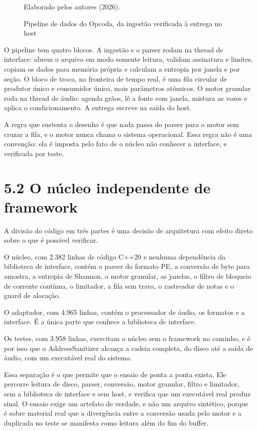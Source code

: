 \documentclass[12pt,a4paper]{article}
\begin{document}
\begin{figure}
\centering
\resizebox{\textwidth}{!}{}
\caption{Pipeline de dados do Opcoda, da ingestão verificada à entrega no host}
\label{fig:pipeline}
{\footnotesize Elaborado pelos autores (2026).\par}
\end{figure}

O pipeline tem quatro blocos. A ingestão e o parser rodam na thread de interface: abrem o arquivo em modo somente leitura, validam assinatura e limites, copiam os dados para memória própria e calculam a entropia por janela e por seção. O bloco de troca, na fronteira de tempo real, é uma fila circular de produtor único e consumidor único, mais parâmetros atômicos. O motor granular roda na thread de áudio: agenda grãos, lê a fonte com janela, mistura as vozes e aplica o condicionamento. A entrega escreve na saída do host.


A regra que sustenta o desenho é que nada passa do parser para o motor sem cruzar a fila, e o motor nunca chama o sistema operacional. Essa regra não é uma convenção: ela é imposta pelo fato de o núcleo não conhecer a interface, e verificada por teste.


\section*{5.2 O núcleo independente de framework}

A divisão do código em três partes é uma decisão de arquitetura com efeito direto sobre o que é possível verificar.


O núcleo, com 2.382 linhas de código C++20 e nenhuma dependência da biblioteca de interface, contém o parser do formato PE, a conversão de byte para amostra, a entropia de Shannon, o motor granular, as janelas, o filtro de bloqueio de corrente contínua, o limitador, a fila sem trava, o rastreador de notas e o guard de alocação.


O adaptador, com 4.965 linhas, contém o processador de áudio, os formatos e a interface. É a única parte que conhece a biblioteca de interface.


Os testes, com 3.958 linhas, exercitam o núcleo sem o framework no caminho, e é por isso que o AddressSanitizer alcança a cadeia completa, do disco até a saída de áudio, com um executável real do sistema.


Essa separação é o que permite que o ensaio de ponta a ponta exista. Ele percorre leitura de disco, parser, conversão, motor granular, filtro e limitador, sem a biblioteca de interface e sem host, e verifica que um executável real produz sinal. O ensaio exige um artefato de verdade, e não um arquivo sintético, porque é sobre material real que a divergência entre a conversão usada pelo motor e a duplicada no teste se manifesta como leitura além do fim do buffer.
\end{document}

